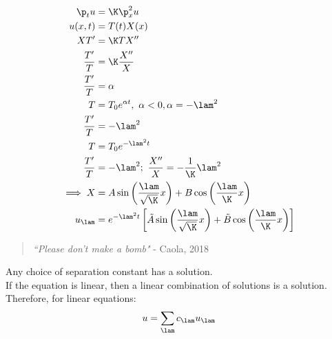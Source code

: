 \documentclass[Maths.tex]{subfiles}
\begin{document}
\begin{example}[Diffusion in 1D]
\begin{align}
	\p_tu &= \K\p_x^2u \\
	u(x,t) &= T(t)X(x) \\
	XT' &= \K TX'' \\
	\frac{T'}{T} &= \K\frac{X''}{X} \\
	\frac{T'}{T} &= \alpha \\
	T &= T_0e^{\alpha t},~ \alpha < 0, \alpha = -\lam^2 \\
	\frac{T'}{T} &= -\lam^2 \\
	T &= T_0e^{-\lam^2 t} \\
	\frac{T'}{T} &= -\lam^2;~ \frac{X''}{X} = -\frac{1}{\K}\lam^2 \\
	\implies X &= A\sin\left(\frac{\lam}{\sqrt{\K}}x\right) + B\cos\left(\frac{\lam}{\K}x\right) \\
	u_\lam &= e^{-\lam^2t} \left[\tilde{A}\sin\left(\frac{\lam}{\sqrt{\K}}x\right) + \tilde{B}\cos\left(\frac{\lam}{\K}x\right)\right]
\end{align}
\begin{quote}
 \textit{``Please don't make a bomb"} - Caola, 2018
\end{quote}
\end{example}

Any choice of separation constant has a solution. \\
If the equation is linear, then a linear combination of solutions is a solution.
Therefore, for linear equations:
\begin{equation}
	u = \sum_{\lam} c_\lam u_\lam
\end{equation}
\end{document}
